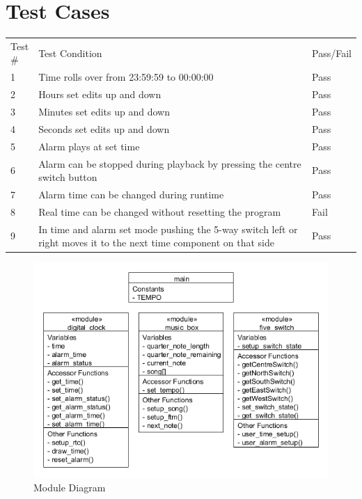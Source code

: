 \documentclass[a4paper]{article}
\begin{document}
\newpage
\maketitle
\section{Test Cases}
\begin{table}[h]
	\begin{tabular}{|p{0.05\linewidth}| p{0.85\linewidth}| p{0.1\linewidth}|}
	\cline{1-3}
	Test \# & Test Condition & Pass/Fail \\ \cline{1-3}
	1 & Time rolls over from 23:59:59 to 00:00:00 & Pass \\ \cline{1-3}
	2 & Hours set edits up and down & Pass \\ \cline{1-3}
	3 & Minutes set edits up and down & Pass \\ \cline{1-3}
	4 & Seconds set edits up and down & Pass \\ \cline{1-3}
	5 & Alarm plays at set time & Pass \\ \cline{1-3}
	6 & Alarm can be stopped during playback by pressing the centre switch button & Pass \\ \cline{1-3}
	7 & Alarm time can be changed during runtime & Pass \\ \cline{1-3}
	8 & Real time can be changed without resetting the program & Fail \\ \cline{1-3}
	9 & In time and alarm set mode pushing the 5-way switch left or right moves it to the next time component on that side & Pass \\ \cline{1-3}
	\end{tabular}
\end{table}

\begin{figure}[h]
\centering
\includegraphics[width=130mm]{module_diagram.png}
\caption{Module Diagram}
\label{overflow}
\end{figure}
\end{document}
